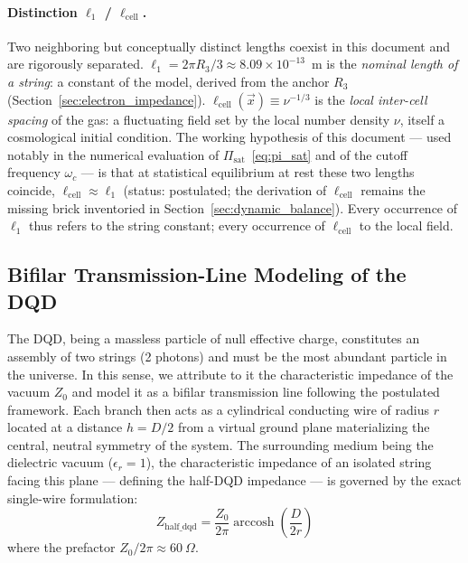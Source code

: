 \documentclass[11pt,a4paper]{article}
\theoremstyle{plain}
\theoremstyle{remark}
\begin{document}
\paragraph{Distinction $\ell_1$ / $\ell_{\text{cell}}$.}
Two neighboring but conceptually distinct lengths coexist in this document and are rigorously separated. $\ell_1 = 2\pi R_3/3 \approx 8.09\times10^{-13}$~m is the \emph{nominal length of a string}: a constant of the model, derived from the anchor $R_3$ (Section~\ref{sec:electron_impedance}). $\ell_{\text{cell}}(\vec{x}) \equiv \nu^{-1/3}$ is the \emph{local inter-cell spacing} of the gas: a fluctuating field set by the local number density $\nu$, itself a cosmological initial condition. The working hypothesis of this document --- used notably in the numerical evaluation of $\Pi_{\text{sat}}$~\eqref{eq:pi_sat} and of the cutoff frequency $\omega_c$ --- is that at statistical equilibrium at rest these two lengths coincide, $\ell_{\text{cell}} \approx \ell_1$ (status: postulated; the derivation of $\ell_{\text{cell}}$ remains the missing brick inventoried in Section~\ref{sec:dynamic_balance}). Every occurrence of $\ell_1$ thus refers to the string constant; every occurrence of $\ell_{\text{cell}}$ to the local field.

\subsection{Bifilar Transmission-Line Modeling of the DQD}
\label{sec:bifilar_model}

The DQD, being a massless particle of null effective charge, constitutes an assembly of two strings (2 photons) and must be the most abundant particle in the universe. In this sense, we attribute to it the characteristic impedance of the vacuum $Z_0$ and model it as a bifilar transmission line following the postulated framework. Each branch then acts as a cylindrical conducting wire of radius $r$ located at a distance $h = D/2$ from a virtual ground plane materializing the central, neutral symmetry of the system. The surrounding medium being the dielectric vacuum ($\epsilon_r = 1$), the characteristic impedance of an isolated string facing this plane --- defining the half-DQD impedance --- is governed by the exact single-wire formulation:
\begin{equation}\label{eq:Z_half_dqd}
Z_{\text{half\_dqd}} = \frac{Z_0}{2\pi} \operatorname{arccosh}
\!\left(\frac{D}{2r}\right)
\end{equation}
where the prefactor $Z_0/2\pi \approx 60~\Omega$.
\end{document}
